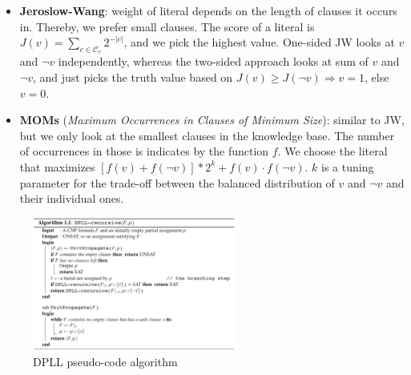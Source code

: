 \begin{itemize}
\begin{enumerate}
\begin{itemize}
			\item \textbf{Jeroslow-Wang}: weight of literal depends on the length of clauses it occurs in. Thereby, we prefer small clauses. The score of a literal is $J(v)=\sum_{c\in \mathcal{C}_v} 2^{-|c|}$, and we pick the highest value. One-sided JW looks at $v$ and $\lnot v$ independently, whereas the two-sided approach looks at sum of $v$ and $\lnot v$, and just picks the truth value based on $J(v)\geq J(\lnot v)\Rightarrow v=1$, else $v=0$.
			\item \textbf{MOMs} (\textit{Maximum Occurrences in Clauses of Minimum Size}): similar to JW, but we only look at the smallest clauses in the knowledge base. The number of occurrences in those is indicates by the function $f$. We choose the literal that maximizes $[f(v)+f(\lnot v)]*2^{k}+f(v)\cdot f(\lnot v)$. $k$ is a tuning parameter for the trade-off between the balanced distribution of $v$ and $\lnot v$ and their individual ones.
		\end{itemize}
	\end{enumerate}
	\begin{figure}[ht!]
		\centering
		\includegraphics[width=0.6\textwidth]{figures/kr_sat_dpll_algorithm.png}
		\caption{DPLL pseudo-code algorithm}
		\label{fig:kr_sat_dpll_algorithm}
	\end{figure}
\end{itemize}
